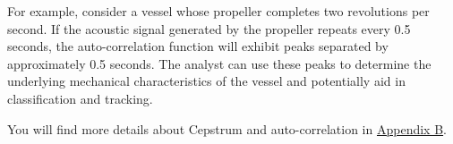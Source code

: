 For example, consider a vessel whose propeller completes two revolutions per second. If the acoustic signal generated by the propeller repeats every 0.5 seconds, the auto-correlation function will exhibit peaks separated by approximately 0.5 seconds. The analyst can use these peaks to determine the underlying mechanical characteristics of the vessel and potentially aid in classification and tracking.

You will find more details about Cepstrum and auto-correlation in \hyperref[sec:Appendix_B]{Appendix B}.

\pagebreak